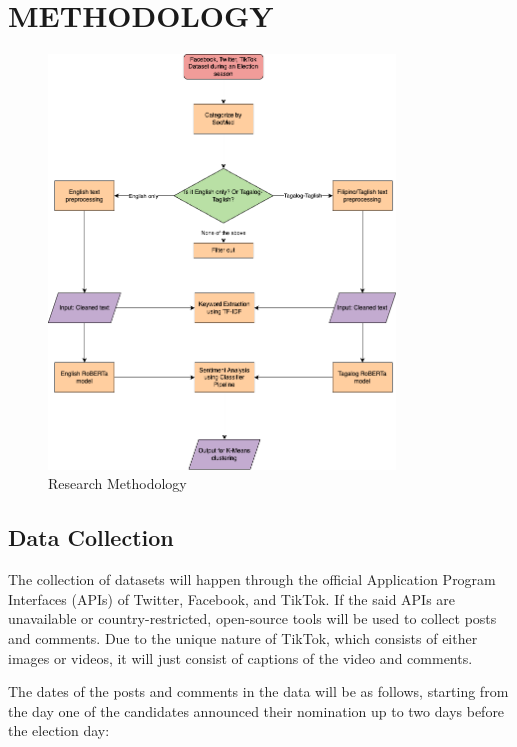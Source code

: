 \chapter{METHODOLOGY}

\begin{figure}[htb]
    \centering
    \includegraphics[width=0.82\textwidth]{Figures/methodology_flowchart.png}
    \caption{Research Methodology}
    \label{fig:Methodology}
\end{figure}

\section{Data Collection}
The collection of datasets will happen through the official Application Program Interfaces (APIs) of Twitter, Facebook, and TikTok. If the said APIs are unavailable or country-restricted, open-source tools will be used to collect posts and comments. Due to the unique nature of TikTok, which consists of either images or videos, it will just consist of captions of the video and comments. 

The dates of the posts and comments in the data will be as follows, starting from the day one of the candidates announced their nomination up to two days before the election day:

